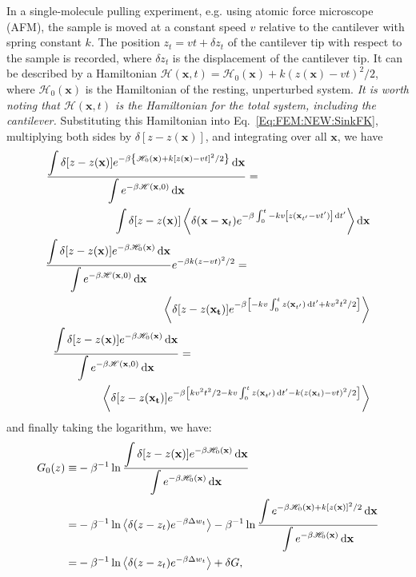 In a single-molecule pulling experiment, e.g. using atomic force microscope (AFM), the sample is moved at a constant speed $v$ relative to the cantilever with spring constant $k$. The position $z_t=vt+\delta z_t$ of the cantilever tip with respect to the sample is recorded, where $\delta z_t$ is the displacement of the cantilever tip. It can be described by a Hamiltonian $\mathscr{H}(\mathbf{x},t)=\mathscr{H}_0(\mathbf{x})+k(z(\mathbf{x})-vt)^2/2$, where $\mathscr{H}_0(\mathbf{x})$ is the Hamiltonian of the resting, unperturbed system. \textit{It is worth noting that $\mathscr{H}(\mathbf{x},t)$ is the Hamiltonian for the total system, including the cantilever.} Substituting this Hamiltonian into Eq.~\ref{Eq:FEM:NEW:SinkFK}, multiplying both sides by $\delta[z-z(\mathbf{x})]$, and integrating over all $\mathbf{x}$, we have
\begin{align}
	\frac{\displaystyle\int\delta[z-z(\mathbf{x})]e^{-\beta \left\{\mathscr{H}_0(\mathbf{x})+k[z(\mathbf{x})-vt]^2/2\right\}}\diff \mathbf{x}}{\displaystyle\int e^{-\beta \mathscr{H}(\mathbf{x},0)}\diff \mathbf{x}}=\qquad\qquad\qquad\qquad\qquad&\notag\\
	\int \delta[z-z(\mathbf{x})] \left\langle \delta(\mathbf{x}-\mathbf{x}_t)e^{-\beta\int_0^t -kv\left[z(\mathbf{x}_{t^\prime}-vt^\prime)\right] \diff t^\prime}\right\rangle \diff \mathbf{x}\notag\\
	\frac{\displaystyle\int\delta[z-z(\mathbf{x})]e^{-\beta \mathscr{H}_0(\mathbf{x})}\diff \mathbf{x}}{\displaystyle\int e^{-\beta \mathscr{H}(\mathbf{x},0)}\diff \mathbf{x}}e^{-\beta k(z-vt)^2/2}=\qquad\qquad\qquad\qquad\qquad\quad&\notag\\
	\left\langle \delta[z-z(\mathbf{x_{t}})] e^{-\beta \left[-kv\int_0^t z(\mathbf{x}_{t^\prime})\diff t^\prime+kv^2t^2/2\right]}\right\rangle\notag\\
	\frac{\displaystyle\int\delta[z-z(\mathbf{x})]e^{-\beta \mathscr{H}_0(\mathbf{x})}\diff \mathbf{x}}{\displaystyle\int e^{-\beta \mathscr{H}(\mathbf{x},0)}\diff \mathbf{x}}=\qquad\qquad\qquad\qquad\qquad\qquad\qquad\qquad&\notag\\
	\left\langle \delta[z-z(\mathbf{x_{t}})] e^{-\beta \left[kv^2t^2/2-kv\int_0^t z(\mathbf{x}_{t^\prime})\diff t^\prime-k(z(\mathbf{x}_t)-vt)^2/2\right]}\right\rangle
\end{align}
and finally taking the logarithm, we have:
\begin{align}
	G_0(z)\equiv&-\beta^{-1}\ln{\frac{\displaystyle\int\delta[z-z(\mathbf{x})]e^{-\beta \mathscr{H}_0(\mathbf{x})}\mathop{}\!\mathrm{d}\mathbf{x}}{\displaystyle\int e^{-\beta \mathscr{H}_0(\mathbf{x})}\mathop{}\!\mathrm{d}\mathbf{x}}}\notag\\
	      =&-\beta^{-1}\ln{\left<\delta(z-z_t)e^{-\beta \Delta w_t}\right>}-\beta^{-1}\ln{\frac{\displaystyle\int e^{-\beta \mathscr{H}_0(\mathbf{x})+k[z(\mathbf{x})]^2/2}\mathop{}\!\mathrm{d}\mathbf{x}}{\displaystyle\int e^{-\beta \mathscr{H}_0(\mathbf{x})}\mathop{}\!\mathrm{d}\mathbf{x}}}\notag\\
	      =&-\beta^{-1}\ln{\left<\delta(z-z_t)e^{-\beta \Delta w_t}\right>}+\delta G,
\end{align}
